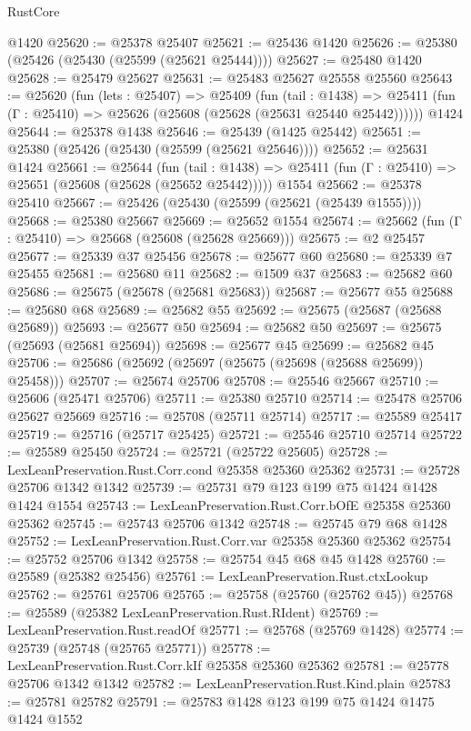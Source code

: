 \begin{lexlean}{RustCore}
\begin{coremodule}
    @1420
@25620 := @25378 @25407
@25621 := @25436 @1420
@25626 := @25380 (@25426 (@25430 (@25599 (@25621 @25444))))
@25627 := @25480 @1420
@25628 := @25479 @25627
@25631 := @25483 @25627 @25558 @25560
@25643 := @25620
    (fun (lets : @25407) =>
    @25409
      (fun (tail : @1438) =>
      @25411 (fun (Γ : @25410) => @25626 (@25608 (@25628 (@25631 @25440 @25442))))))
    @1424
@25644 := @25378 @1438
@25646 := @25439 (@1425 @25442)
@25651 := @25380 (@25426 (@25430 (@25599 (@25621 @25646))))
@25652 := @25631 @1424
@25661 := @25644
    (fun (tail : @1438) => @25411 (fun (Γ : @25410) => @25651 (@25608 (@25628 (@25652 @25442)))))
    @1554
@25662 := @25378 @25410
@25667 := @25426 (@25430 (@25599 (@25621 (@25439 @1555))))
@25668 := @25380 @25667
@25669 := @25652 @1554
@25674 := @25662 (fun (Γ : @25410) => @25668 (@25608 (@25628 @25669)))
@25675 := @2 @25457
@25677 := @25339 @37 @25456
@25678 := @25677 @60
@25680 := @25339 @7 @25455
@25681 := @25680 @11
@25682 := @1509 @37
@25683 := @25682 @60
@25686 := @25675 (@25678 (@25681 @25683))
@25687 := @25677 @55
@25688 := @25680 @68
@25689 := @25682 @55
@25692 := @25675 (@25687 (@25688 @25689))
@25693 := @25677 @50
@25694 := @25682 @50
@25697 := @25675 (@25693 (@25681 @25694))
@25698 := @25677 @45
@25699 := @25682 @45
@25706 := @25686 (@25692 (@25697 (@25675 (@25698 (@25688 @25699)) @25458)))
@25707 := @25674 @25706
@25708 := @25546 @25667
@25710 := @25606 (@25471 @25706)
@25711 := @25380 @25710
@25714 := @25478 @25706 @25627 @25669
@25716 := @25708 (@25711 @25714)
@25717 := @25589 @25417
@25719 := @25716 (@25717 @25425)
@25721 := @25546 @25710 @25714
@25722 := @25589 @25450
@25724 := @25721 (@25722 @25605)
@25728 := LexLeanPreservation.Rust.Corr.cond @25358 @25360 @25362
@25731 := @25728 @25706 @1342 @1342
@25739 := @25731 @79 @123 @199 @75 @1424 @1428 @1424 @1554
@25743 := LexLeanPreservation.Rust.Corr.bOfE @25358 @25360 @25362
@25745 := @25743 @25706 @1342
@25748 := @25745 @79 @68 @1428
@25752 := LexLeanPreservation.Rust.Corr.var @25358 @25360 @25362
@25754 := @25752 @25706 @1342
@25758 := @25754 @45 @68 @45 @1428
@25760 := @25589 (@25382 @25456)
@25761 := LexLeanPreservation.Rust.ctxLookup
@25762 := @25761 @25706
@25765 := @25758 (@25760 (@25762 @45))
@25768 := @25589 (@25382 LexLeanPreservation.Rust.RIdent)
@25769 := LexLeanPreservation.Rust.readOf
@25771 := @25768 (@25769 @1428)
@25774 := @25739 (@25748 (@25765 @25771))
@25778 := LexLeanPreservation.Rust.Corr.kIf @25358 @25360 @25362
@25781 := @25778 @25706 @1342 @1342
@25782 := LexLeanPreservation.Rust.Kind.plain
@25783 := @25781 @25782
@25791 := @25783 @1428 @123 @199 @75 @1424 @1475 @1424 @1552

\end{coremodule}
\end{lexlean}
